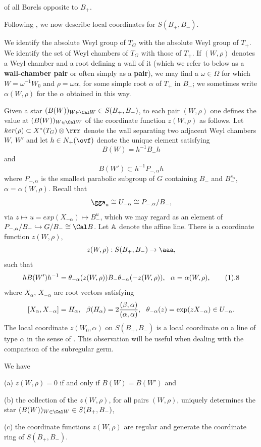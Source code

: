 of all Borels opposite to $B_+$.
\par
Following \cite{L}, we now describe local coordinates for 
$S(B_+,B_-)$.
\par
We identify the absolute Weyl group of $T_G$ with the absolute
Weyl group of
$T_+$.
We identify the set of Weyl chambers of $T_G$ with those of $T_+$.
If $(W,\rho)$ denotes a Weyl chamber and a 
root defining a wall
of it (which we refer to below as a {\bf wall-chamber pair}
or often simply as a {\bf pair}), 
we may find a $\omega\in\Omega$ for which
$W=\omega^{-1}W_0$ and $\rho=\omega \alpha$, for some 
simple root $\alpha$ of $T_+$ in $B_-$;
we sometimes write $\alpha(W,\rho)$ for
the $\alpha$ obtained in this way.
\par
Given a star $(B(W))_{W\in{\Cal W}}\in S(B_+,B_-)$,
to each pair $(W,\rho)$ one defines
the value at $(B(W))_{W\in{\Cal W}}$ of the coordinate
function $z(W,\rho)$ as follows. Let $ker(\rho)
\subset X^*(T_G)\otimes {\rrr}$
denote the wall separating two adjacent Weyl chambers
$W$, $W'$ and let $h\in N_+(\ovf)$ denote the unique element
satisfying 
$$
B(W)=h^{-1}B_-h
$$
and
$$
B(W')\subset h^{-1}P_{-,\alpha} h
$$
where $P_{-,\alpha}$ is the smallest parabolic subgroup 
of $G$ containing $B_-$ and $B_-^{s_\alpha}$, $\alpha 
=\alpha (W,\rho)$.
Recall that
$$
\gga_a\cong U_{-\alpha}\cong P_{-,\alpha}/B_-,
$$
via $z\longmapsto u=exp(X_{-\alpha})\longmapsto B_-^u$, which we may
regard as an element of $P_{-,\alpha}/B_-\hookrightarrow G/B_-\cong {\Cal B}$.
Let ${\Bbb A}$ denote the affine line.
There is a coordinate function $z(W,\rho)$,
$$
z(W,\rho):S(B_+,B_-)\rightarrow \aaa,
$$
such that
$$
hB(W')h^{-1}=\theta_{-\alpha} (z(W,\rho))B_-\theta_{-\alpha} (-z(W,\rho)),
\ \ \alpha=\alpha(W,\rho),
\tag 1.8
$$
where $X_\alpha$, $X_{-\alpha}$ are root vectors satisfying
$$
[X_\alpha, X_{-\alpha}]=H_\alpha,\ \  
\beta(H_{\alpha})=2{(\beta,\alpha)\over (\alpha,\alpha)},\ \ 
\theta_{-\alpha}(z)=\exp(zX_{-\alpha})\in U_{-\alpha}.
$$
The local coordinate $z(W_0,\alpha)$ on $S(B_+,B_-)$ is
a local coordinate on a line of type $\alpha$ in the sense
of \cite{St}. This observation will be useful when dealing with the
comparison of the subregular germ.

We have

(a) $z(W,\rho)=0$ if and only if $B(W)=B(W')$ and 

(b) the collection of the $z(W,\rho)$, for all pairs $(W,\rho)$,
uniquely determines the star $(B(W))_{W\in{\Cal W}}\in S(B_+,B_-)$,

(c) the coordinate functions $z(W,\rho)$ are regular and generate
the coordinate ring of $S(B_+,B_-)$.

